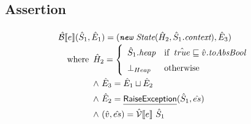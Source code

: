 \subsection{Assertion}
\[
\renewcommand\arraystretch{1.5}
\begin{array}{l}

\aB \lbr e \rbr (\hat{S}_1, \hat{E}_1) 
    = (\emph{\TT{new}\ State}(\hat{H}_2, \hat{S}_1\emph{.context}), \hat{E}_3) \\
\quad\wherec{
    \hat{H}_2 = \left \{
	\begin{array}{ll}
        \hat{S}_1\emph{.heap} & \ifc{\hat{true} \sqsubseteq \hat{v}\emph{.toAbsBool}} \\
	    \bot_{Heap} & \owc
    \end{array}  \right.\\
    \land\ \hat{E}_3 = \hat{E}_1 \sqcup \hat{E}_2 \\
    \land\ \hat{E}_2 = \chf{RaiseException}(\hat{S}_1, \hat{es}) \\
	\land\ (\hat{v}, \hat{es}) = \aV \lbr e \rbr\ \hat{S}_1
}\\\\

\end{array}
\]
